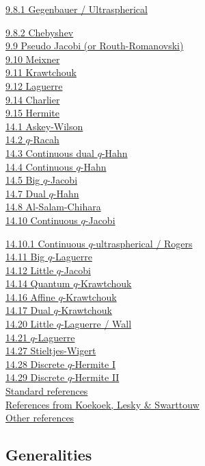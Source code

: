 \documentclass[twoside,11pt]{article}
\newcommand\sa{\smallskipamount}
\newcommand\sLP{\\[\sa]}
\begin{document}
\hyperref[sec9.8.1]{9.8.1 Gegenbauer / Ultraspherical}

\hyperref[sec9.8.2]{9.8.2 Chebyshev}\\
\hyperref[sec9.9]{9.9 Pseudo Jacobi (or Routh-Romanovski)}\\
\hyperref[sec9.10]{9.10 Meixner}\\
\hyperref[sec9.11]{9.11 Krawtchouk}\\
\hyperref[sec9.12]{9.12 Laguerre}\\
\hyperref[sec9.14]{9.14 Charlier}\\
\hyperref[sec9.15]{9.15 Hermite}
\sLP
\hyperref[sec14.1]{14.1 Askey-Wilson}\\
\hyperref[sec14.2]{14.2 $q$-Racah}\\
\hyperref[sec14.3]{14.3 Continuous dual $q$-Hahn}\\
\hyperref[sec14.4]{14.4 Continuous $q$-Hahn}\\
\hyperref[sec14.5]{14.5 Big $q$-Jacobi}\\
\hyperref[sec14.7]{14.7 Dual $q$-Hahn}\\
\hyperref[sec14.8]{14.8 Al-Salam-Chihara}\\
\hyperref[sec14.10]{14.10 Continuous $q$-Jacobi}

\hyperref[sec14.10.1]{14.10.1 Continuous $q$-ultraspherical / Rogers}\\
\hyperref[sec14.11]{14.11 Big $q$-Laguerre}\\
\hyperref[sec14.12]{14.12 Little $q$-Jacobi}\\
\hyperref[sec14.14]{14.14 Quantum $q$-Krawtchouk}\\
\hyperref[sec14.16]{14.16 Affine $q$-Krawtchouk}\\
\hyperref[sec14.17]{14.17 Dual $q$-Krawtchouk}\\
\hyperref[sec14.20]{14.20 Little $q$-Laguerre / Wall}\\
\hyperref[sec14.21]{14.21 $q$-Laguerre}\\
\hyperref[sec14.27]{14.27 Stieltjes-Wigert}\\
\hyperref[sec14.28]{14.28 Discrete $q$-Hermite I}\\
\hyperref[sec14.29]{14.29 Discrete $q$-Hermite II}
\sLP
\hyperref[sec_ref1]{Standard references}\\
\hyperref[sec_ref2]{References from Koekoek, Lesky \& Swarttouw}\\
\hyperref[sec_ref3]{Other references}
%
\newpage
%
\subsection*{Generalities}
\label{sec_general}
\end{document}
